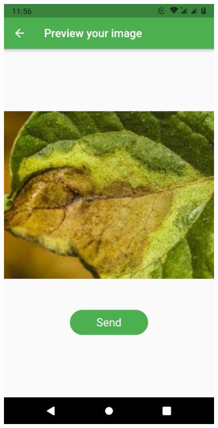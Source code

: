 \documentclass[11pt]{report}
\begin{document}
\begin{figure}[h]
	\centerline{\small 
		\includegraphics[height=0.20\textheight]  {h3}}
\end{figure}
\end{document}
